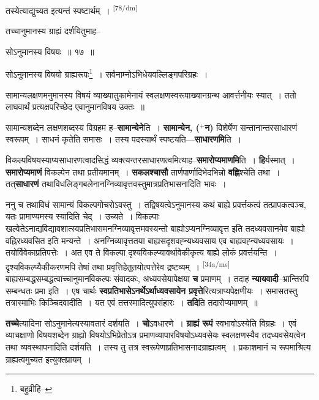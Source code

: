 \documentclass[article,12pt,a4paper]{memoir}
\newcommand{\add}[1]{($^{+}$#1)}
\begin{document}
	  \pstart तस्येत्याद्युच्यत इत्यन्तं स्पष्टार्थम् ।
	\pend
      \leavevmode\textsuperscript{\rmlatinfont\tiny [78/dm]}

	  \pstart तच्चानुमानस्य ग्राह्यं दर्शयितुमाह--
	\pend
       

	  \pstart सोऽनुमानस्य विषयः ॥ १७ ॥
	\pend
       

	  \pstart सोऽनुमानस्य विषयो ग्राह्यरूपः\footnote{बहुव्रीहि--\cite{dp-msD-n}} । सर्वनाम्नोऽभिधेयवल्लिङ्गपरिग्रहः ।
	\pend
       

	  \pstart सामान्यलक्षणमनुमानस्य विषयं व्याख्यातुकामेनायं स्वलक्षणस्वरूपाख्यानग्रन्थ आवर्त्तनीयः स्यात् । ततो लाघवार्थं प्रत्यक्षपरिच्छेद एवानुमानविषय उक्तः ॥
	\pend
      

	  \pstart सामान्यशब्देन लक्षणशब्दस्य विग्रहम ह--\textbf{सामान्येने}ति । \textbf{सामान्येन, \add{न}} विशेर्षेण सन्तानान्तरसाधारणं स्वरूपम् । साधनं कृतेति समासः । तस्य पदस्यार्थं स्पष्टयति—\textbf{साधारणमि}ति ।
	\pend
      

	  \pstart विकल्पविषयस्याप्यसाधारणत्वादसिद्धं व्यक्त्यन्तरसाधारणत्वमित्याह--\textbf{समारोप्यमाणमि}ति । \textbf{हि}र्यस्मात् । \textbf{समारोप्यमाणं} विकल्पेन तथा प्रतीयमानम् । \textbf{सकलश्चासौ} तार्णपार्णादिभेदभिन्नो \textbf{वह्नि}श्चेति तथा । तत्\textbf{साधारणं} तथाविधलिङ्गबलेनानग्निव्यावृत्तवस्तुमात्रप्रतिभासनादिति भावः ।
	\pend
      

	  \pstart ननु च तथाविधं सामान्यं विकल्पगोचरोऽवस्तु । तद्विषयत्वेऽनुमानस्य कथं बाह्ये प्रवर्त्तकत्वं तत्प्रापकत्वञ्च, यतः प्रामाण्यमस्य स्यादिति चेद् । उच्यते । विकल्पाः खल्वेतेऽनाद्यविद्यावशात्स्वप्रतिभासमनग्निव्यावृत्तमवस्यन्तो बाह्योऽप्यनग्निव्यावृत्त इति तदध्यवसानमेव बाह्यो वह्निरध्यवसित इति मन्यन्ते । अनग्निव्यावृत्ततया बाह्यसदृशवह्न्यध्यवसाय एव बाह्यवह्न्यध्यवसायः । तयोर्विवेकाप्रतिपत्तेः । अत एव ते विकल्पा दृश्यविकल्प्यावर्थावेकीकृत्य बाह्ये लोकं प्रवर्त्तयन्ति । दृश्यविकल्प्यैकीकरणमपि तेषां तथा प्रवृत्तिहेतुतयोत्पत्तेरेव द्रष्टव्यम् । \leavevmode\textsuperscript{\rmlatinfont\tiny [34a/ms]} बाह्यसम्बद्धसम्बद्धत्वाच्चानुमानविकल्पः संवादकः, अध्यवसेयापेक्षया \textbf{च} प्रमाणम् । तदाह \textbf{न्यायवादी}--भ्रान्तिरपि सम्बन्धतः प्रमा इति । एष चार्थः \textbf{स्वप्रतिभासेऽनर्थेऽर्थाध्यवसायेन प्रवृत्ते}रित्यत्राप्यपेक्षणीयः । समासतस्तु तत्रास्माभिः किञ्चिदवादीति । यत एवं तत्तस्मादित्युपसंहारः । \textbf{तदि}ति तदारोप्यमाणम् ॥
	\pend
      

	  \pstart \textbf{तच्चे}त्यादिना सोऽनुमानेत्यस्यावतारं दर्शयति । \textbf{चो}ऽवधारणे । \textbf{ग्राह्यं रूपं} स्वभावोऽस्येति विग्रहः । एवं व्याचक्षाणो विषयशब्देन ग्राह्यो विषयोऽभिप्रेतोऽत्र प्रमाणव्यापारविषयोऽध्यवसेयः स्वलक्षणस्यैव तदध्यवसेयत्वेन तथा व्यवस्थापनादिति दर्शयति । तस्य तु तत्र स्वरूपेणाप्रतिभासनादग्राह्यत्वम् । प्रकाशमानं च रूपमाश्रित्य ग्राह्यत्वमुच्यत इत्युक्तप्रायम् ।
	\pend
      
\end{document}
